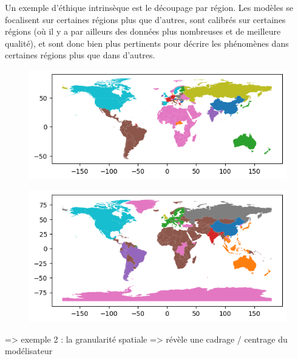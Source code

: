 Un exemple d'éthique intrinsèque est le découpage par région. Les modèles se focalisent sur certaines régions plus que d'autres, sont calibrés sur certaines régions (où il y a par ailleurs des données plus nombreuses et de meilleure qualité), et sont donc bien plus pertinents pour décrire les phénomènes dans certaines régions plus que dans d'autres. 

\begin{figure}[htbp]
    \centering
    \begin{minipage}{0.45\textwidth}
        \centering
        \includegraphics[width=\linewidth]{figures/FUND_regions.png} %
        \label{fig:carte1}
    \end{minipage}%
    \hfill
    \begin{minipage}{0.45\textwidth}
        \centering
        \includegraphics[width=\linewidth]{figures/WILIAM_regions.png} %
        \label{fig:carte2}
    \end{minipage}%
    \label{fig:trois_cartes}
\end{figure} 

=> exemple 2 : la granularité spatiale
=> révèle une cadrage / centrage du modélisateur 

